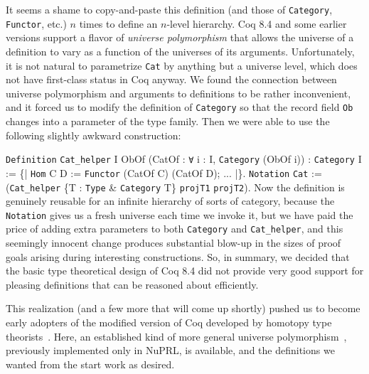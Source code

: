 \documentclass[runningheads]{llncs}
\makeatletter
\gdef\@makeopenbrace<\catcode`{>
\gdef\@makeclosebrace<\catcode`}>
\newcommand{\processcommands}[1]{{%
  \catcode`\\=0\relax
  \@makeopenbrace=1\relax
  \@makeclosebrace=2\relax
  \def\{{\texttt{\mytextbraceleft}}
  \def\}{\texttt{\mytextbraceright}}
  \scantokens{#1}%
}}
\newcommand{\processcommandsinverbatimline}{\expandafter\processcommands\expandafter{\the\verbatim@line}}
\newenvironment{coqcode}{\begingroup
  \vspace{0.5\baselineskip}
  \let\trivlist\relax
  \let\endtrivlist\relax
  \let\item\relax
  \setlength{\parsep}{0pt}%
  \setlength{\parskip}{0pt}%
  \setlength{\topsep}{0pt}%
  \setlength{\@topsepadd}{0pt}%
  \setlength{\partopsep}{0pt}%
  \setlength{\@topsep}{0pt}%
  \let\old@@par\@@par
  \let\@@par\relax
  \let\old@vskip\vskip
  \let\vskip\relax
  \verbatim
  \let\@@par\old@@par
  \let\vskip\old@vskip
  \let\verbatim@processline=\processcommandsinverbatimline
}{\endverbatim\endgroup\vspace{0.5\baselineskip}}
\newcommand{\colortext}[2]{\textcolor{#1}{#2}}
\newcommand{\coqdockw}[1]{\texttt {\colortext{kwred}{#1}}}
\newcommand{\coqdocvar}[1]{\colortext{varpurple}{#1}}
\newcommand{\coqdoccst}[1]{\texttt{\colortext{defgreen}{#1}}}%
\newcommand{\coqdocind}[1]{\texttt{\colortext{indblue}{#1}}}%
\newcommand{\coqdocdefinition}[1]{\coqdoccst{#1}}
\newcommand{\coqdocvariable}[1]{\coqdocvar{#1}}
\newcommand{\coqdocrecord}[1]{\coqdocind{#1}}
\newcommand{\coqdocprojection}[1]{\coqdoccst{#1}}
\makeatother
\begin{document}
    It seems a shame to copy-and-paste this definition (and those of \texttt{Category}, \texttt{Functor}, etc.) $n$ times to define an $n$-level hierarchy.  Coq 8.4 and some earlier versions support a flavor of \emph{universe polymorphism} that allows the universe of a definition to vary as a function of the universes of its arguments.  Unfortunately, it is not natural to parametrize \texttt{Cat} by anything but a universe level, which does not have first-class status in Coq anyway.  We found the connection between universe polymorphism and arguments to definitions to be rather inconvenient, and it forced us to modify the definition of \texttt{Category} so that the record field \texttt{Ob} changes into a parameter of the type family.  Then we were able to use the following slightly awkward construction:
\begin{coqcode}
\coqdockw{Definition} \coqdocdefinition{Cat_helper} \coqdocvariable{I} \coqdocvariable{ObOf} (\coqdocvariable{CatOf} : \coqdockw{∀} \coqdocvariable{i} : \coqdocvariable{I}, \coqdocrecord{Category} (\coqdocvariable{ObOf} \coqdocvariable{i}))
    : \coqdocrecord{Category} \coqdocvariable{I}
 := \{| \coqdocprojection{Hom} \coqdocvariable{C} \coqdocvariable{D} := \coqdocrecord{Functor} (\coqdocvariable{CatOf} \coqdocvariable{C}) (\coqdocvariable{CatOf} \coqdocvariable{D}); ... |\}.
\coqdockw{Notation} \coqdocdefinition{Cat} := (\coqdocdefinition{Cat_helper} \{\coqdocvariable{T} : \coqdockw{Type} \& \coqdocrecord{Category} \coqdocvariable{T}\} \coqdocprojection{projT1} \coqdocprojection{projT2}).
\end{coqcode}
Now the definition is genuinely reusable for an infinite hierarchy of sorts of category, because the \texttt{Notation} gives us a fresh universe each time we invoke it, but we have paid the price of adding extra parameters to both \texttt{Category} and \texttt{Cat\_helper}, and this seemingly innocent change produces substantial blow-up in the sizes of proof goals arising during interesting constructions.  So, in summary, we decided that the basic type theoretical design of Coq 8.4 did not provide very good support for pleasing definitions that can be reasoned about efficiently.

This realization (and a few more that will come up shortly) pushed us to become early adopters of the modified version of Coq developed by homotopy type theorists~\cite{HoTT/coq}.  Here, an established kind of more general universe polymorphism~\cite{Harper1991107}, previously implemented only in NuPRL, is available, and the definitions we wanted from the start work as desired.
\end{document}
